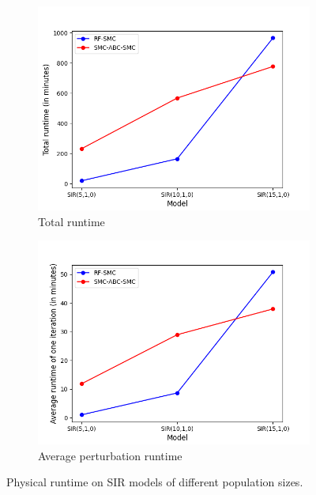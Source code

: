 \begin{figure}[H]
    \centering
    \begin{subfigure}{0.48\textwidth}
        \centering
        \includegraphics[width=\linewidth]{figures/sir_runtime_total.png}
        \caption{Total runtime}
    \end{subfigure}
    \hfill
    \begin{subfigure}{0.48\textwidth}
        \centering
        \includegraphics[width=\linewidth]{figures/sir_runtime_avg.png}
        \caption{Average perturbation runtime}
    \end{subfigure}
    \caption{Physical runtime on SIR models of different population sizes.}
\end{figure}

